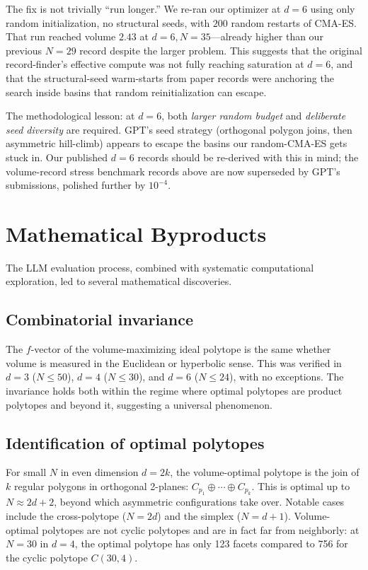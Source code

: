 \documentclass[11pt]{article}
\begin{document}
The fix is not trivially ``run longer.''  We re-ran our
optimizer at $d = 6$ using only random initialization, no
structural seeds, with $200$ random restarts of CMA-ES.
That run reached volume $2.43$ at $d = 6, N = 35$---already higher
than our previous $N = 29$ record despite the larger problem.
This suggests that the original record-finder's effective compute
was not fully reaching saturation at $d = 6$, and that the
structural-seed warm-starts from paper records were anchoring the
search inside basins that random reinitialization can escape.

The methodological lesson: at $d = 6$, both \emph{larger random
budget} and \emph{deliberate seed diversity} are required.  GPT's
seed strategy (orthogonal polygon joins, then asymmetric
hill-climb) appears to escape the basins our random-CMA-ES gets
stuck in.  Our published $d = 6$ records should be re-derived
with this in mind; the volume-record stress benchmark records
above are now superseded by GPT's submissions, polished further by
$10^{-4}$.

\section{Mathematical Byproducts}

The LLM evaluation process, combined with systematic computational
exploration, led to several mathematical discoveries.

\subsection{Combinatorial invariance}
The $f$-vector of the volume-maximizing ideal polytope is the same
whether volume is measured in the Euclidean or hyperbolic sense.
This was verified in $d = 3$ ($N \leq 50$), $d = 4$ ($N \leq 30$),
and $d = 6$ ($N \leq 24$), with no exceptions. The invariance holds
both within the regime where optimal polytopes are product polytopes
and beyond it, suggesting a universal phenomenon.

\subsection{Identification of optimal polytopes}
For small $N$ in even dimension $d = 2k$, the volume-optimal polytope
is the join of $k$ regular polygons in orthogonal 2-planes:
$C_{p_1} \oplus \cdots \oplus C_{p_k}$. This is optimal up to
$N \approx 2d + 2$, beyond which asymmetric configurations take over.
Notable cases include the cross-polytope ($N = 2d$) and the simplex ($N = d+1$).
Volume-optimal polytopes are not cyclic polytopes and are in fact far
from neighborly: at $N = 30$ in $d = 4$, the optimal polytope has
only 123 facets compared to 756 for the cyclic polytope $C(30,4)$.
\end{document}
